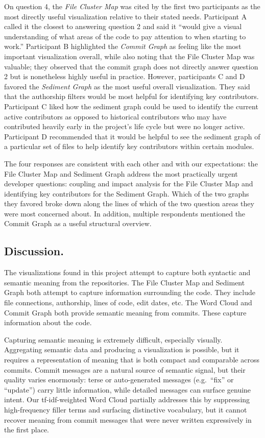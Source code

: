 \documentclass[12 pt]{article}
\begin{document}
On question 4, the \textit{File Cluster Map} was cited by the first two participants
as the most directly useful visualization relative to their stated needs.
Participant A called it the closest to answering question 2 and said it
``would give a visual understanding of what areas of the code to pay
attention to when starting to work.''
Participant B highlighted the \textit{Commit Graph} as feeling like the
most important visualization overall, while also noting that the File Cluster
Map was valuable; they observed that the commit graph does not directly answer
question 2 but is nonetheless highly useful in practice.
However, participants C and D favored the \textit{Sediment Graph} as
the most useful overall visualization. They said that the authorship
filters would be most helpful for identifying key contributors.
Participant C liked how the sediment graph could be used to identify the current
active contributors as opposed to historical contributors who may have
contributed heavily early in the project's life cycle but were no longer active.
Participant D recommended that it would be helpful to see the sediment graph of a particular
set of files to help identify key contributors within certain modules.


The four responses are consistent with each other and with our expectations:
the File Cluster Map and Sediment Graph address the most practically urgent developer
questions: coupling and impact analysis for the File Cluster Map and
identifying key contributors for the Sediment Graph. Which of the two graphs
they favored broke down along the lines of which of the two question areas they
were most concerned about. In addition, multiple respondents mentioned the Commit
Graph as a useful structural overview.

\subsection{Discussion.}

The visualizations found in this project attempt to capture both syntactic and
semantic meaning from the repositories. The File Cluster Map and Sediment Graph
both attempt to capture information surrounding the code. They include file
connections, authorship, lines of code, edit dates, etc. The Word Cloud
and Commit Graph both provide semantic meaning from commits. These capture
information about the code.

Capturing semantic meaning is extremely difficult, especially visually.
Aggregating semantic data and producing a visualization is possible, but it requires
a representation of meaning that is both compact and comparable across commits.
Commit messages are a natural source of semantic signal, but their quality varies
enormously: terse or auto-generated messages (e.g.\ ``fix'' or ``update'') carry
little information, while detailed messages can surface genuine intent.
Our tf-idf-weighted Word Cloud partially addresses this by suppressing
high-frequency filler terms and surfacing distinctive vocabulary, but it cannot
recover meaning from commit messages that were never written expressively in
the first place.
\end{document}
